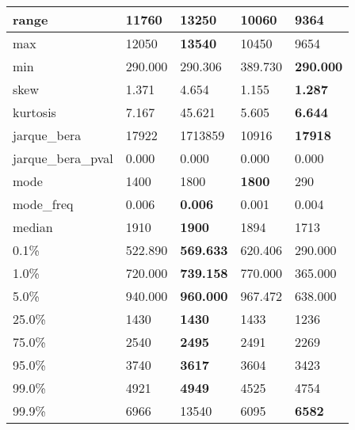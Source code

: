 \begin{table}[H]
\begin{tabular}{|l|m{10em}|m{10em}|m{10em}|m{10em}|}
\hline range & 11760 & \bfseries 13250 & 10060 & \cellcolor[rgb]{0.9, 0.54, 0.52} 9364 \\
\hline max & 12050 & \bfseries 13540 & 10450 & \cellcolor[rgb]{0.9, 0.54, 0.52} 9654 \\
\hline min & 290.000 & 290.306 & \cellcolor[rgb]{0.9, 0.54, 0.52} 389.730 & \bfseries 290.000 \\
\hline skew & 1.371 & \cellcolor[rgb]{0.9, 0.54, 0.52} 4.654 & 1.155 & \bfseries 1.287 \\
\hline kurtosis & 7.167 & \cellcolor[rgb]{0.9, 0.54, 0.52} 45.621 & 5.605 & \bfseries 6.644 \\
\hline jarque\_bera & 17922 & \cellcolor[rgb]{0.9, 0.54, 0.52} 1713859 & 10916 & \bfseries 17918 \\
\hline jarque\_bera\_pval & 0.000 & 0.000 & 0.000 & 0.000 \\
\hline mode & 1400 & 1800 & \bfseries 1800 & \cellcolor[rgb]{0.9, 0.54, 0.52} 290 \\
\hline mode\_freq & 0.006 & \bfseries 0.006 & \cellcolor[rgb]{0.9, 0.54, 0.52} 0.001 & 0.004 \\
\hline median & 1910 & \bfseries 1900 & 1894 & \cellcolor[rgb]{0.9, 0.54, 0.52} 1713 \\
\hline 0.1\% & 522.890 & \bfseries 569.633 & 620.406 & \cellcolor[rgb]{0.9, 0.54, 0.52} 290.000 \\
\hline 1.0\% & 720.000 & \bfseries 739.158 & 770.000 & \cellcolor[rgb]{0.9, 0.54, 0.52} 365.000 \\
\hline 5.0\% & 940.000 & \bfseries 960.000 & 967.472 & \cellcolor[rgb]{0.9, 0.54, 0.52} 638.000 \\
\hline 25.0\% & 1430 & \bfseries 1430 & 1433 & \cellcolor[rgb]{0.9, 0.54, 0.52} 1236 \\
\hline 75.0\% & 2540 & \bfseries 2495 & 2491 & \cellcolor[rgb]{0.9, 0.54, 0.52} 2269 \\
\hline 95.0\% & 3740 & \bfseries 3617 & 3604 & \cellcolor[rgb]{0.9, 0.54, 0.52} 3423 \\
\hline 99.0\% & 4921 & \bfseries 4949 & \cellcolor[rgb]{0.9, 0.54, 0.52} 4525 & 4754 \\
\hline 99.9\% & 6966 & \cellcolor[rgb]{0.9, 0.54, 0.52} 13540 & 6095 & \bfseries 6582 \\
\hline
\end{tabular}
\end{table}
